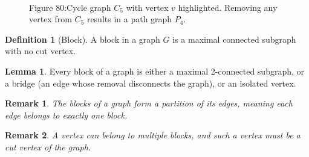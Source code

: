 \documentclass{article}
\newtheorem{remark}{Remark}
\theoremstyle{definition}
\newtheorem{lemma}{Lemma}
\newtheorem{definition}{Definition}
\begin{document}
\begin{figure}[h]
\centering
{}
\\
\small Figure 80:Cycle graph $C_5$ with vertex $v$ highlighted. Removing any vertex from $C_5$ results in a path graph $P_4$.
\label{fig:C5_no_cut_vertices}
\end{figure}

\begin{definition}[Block]
A block in a graph $G$ is a maximal connected subgraph with no cut vertex.
\end{definition}


\begin{lemma}
Every block of a graph is either a maximal 2-connected subgraph, or a bridge (an edge whose removal disconnects the graph), or an isolated vertex.
\end{lemma}

\begin{remark}
The blocks of a graph form a partition of its edges, meaning each edge belongs to exactly one block.
\end{remark}


\begin{remark}
A vertex can belong to multiple blocks, and such a vertex must be a cut vertex of the graph.
\end{remark}
\end{document}
